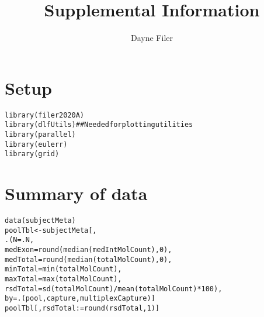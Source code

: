 \documentclass{article}\usepackage[]{graphicx}\usepackage[]{color}
\makeatletter
\newcommand{\hlnum}[1]{\textcolor[rgb]{0.063,0.58,0.627}{#1}}%
\newcommand{\hlcom}[1]{\textcolor[rgb]{0.588,0.588,0.588}{#1}}%
\newcommand{\hlopt}[1]{\textcolor[rgb]{0.196,0.196,0.196}{#1}}%
\newcommand{\hlstd}[1]{\textcolor[rgb]{0.196,0.196,0.196}{#1}}%
\newcommand{\hlkwb}[1]{\textcolor[rgb]{0.627,0,0.314}{#1}}%
\newcommand{\hlkwc}[1]{\textcolor[rgb]{0,0.631,0.314}{#1}}%
\newcommand{\hlkwd}[1]{\textcolor[rgb]{0.78,0.227,0.412}{#1}}%
\newenvironment{kframe}{%
 \def\at@end@of@kframe{}%
 \ifinner\ifhmode%
  \def\at@end@of@kframe{\end{minipage}}%
  \begin{minipage}{\columnwidth}%
 \fi\fi%
 \def\FrameCommand##1{\hskip\@totalleftmargin \hskip-\fboxsep
 \colorbox{shadecolor}{##1}\hskip-\fboxsep
     \hskip-\linewidth \hskip-\@totalleftmargin \hskip\columnwidth}%
 \MakeFramed {\advance\hsize-\width
   \@totalleftmargin\z@ \linewidth\hsize
   \@setminipage}}%
 {\par\unskip\endMakeFramed%
 \at@end@of@kframe}
\newenvironment{knitrout}{}{} %
\makeatother
\begin{document}
\title{Supplemental Information}
\author{Dayne Filer}
\maketitle

\tableofcontents

\newpage
\section{Setup}

\begin{knitrout}
\color{fgcolor}\begin{kframe}
\begin{alltt}
\hlkwd{library}\hlstd{(filer2020A)}
\hlkwd{library}\hlstd{(dlfUtils)} \hlcom{## Needed for plotting utilities}
\hlkwd{library}\hlstd{(parallel)}
\hlkwd{library}\hlstd{(eulerr)}
\hlkwd{library}\hlstd{(grid)}
\end{alltt}
\end{kframe}
\end{knitrout}

\section{Summary of data}

\begin{knitrout}
\color{fgcolor}\begin{kframe}
\begin{alltt}
\hlkwd{data}\hlstd{(subjectMeta)}
\hlstd{poolTbl} \hlkwb{<-} \hlstd{subjectMeta[ ,}
                       \hlkwd{.}\hlstd{(}\hlkwc{N} \hlstd{= .N,}
                         \hlkwc{medExon} \hlstd{=} \hlkwd{round}\hlstd{(}\hlkwd{median}\hlstd{(medIntMolCount),} \hlnum{0}\hlstd{),}
                         \hlkwc{medTotal} \hlstd{=} \hlkwd{round}\hlstd{(}\hlkwd{median}\hlstd{(totalMolCount),} \hlnum{0}\hlstd{),}
                         \hlkwc{minTotal} \hlstd{=} \hlkwd{min}\hlstd{(totalMolCount),}
                         \hlkwc{maxTotal} \hlstd{=} \hlkwd{max}\hlstd{(totalMolCount),}
                         \hlkwc{rsdTotal} \hlstd{=} \hlkwd{sd}\hlstd{(totalMolCount)}\hlopt{/}\hlkwd{mean}\hlstd{(totalMolCount)}\hlopt{*}\hlnum{100}\hlstd{),}
                       \hlkwc{by} \hlstd{=} \hlkwd{.}\hlstd{(pool, capture, multiplexCapture)]}
\hlstd{poolTbl[ , rsdTotal} \hlkwb{:=} \hlkwd{round}\hlstd{(rsdTotal,} \hlnum{1}\hlstd{)]}
\end{alltt}
\end{kframe}
\end{knitrout}
\end{document}
